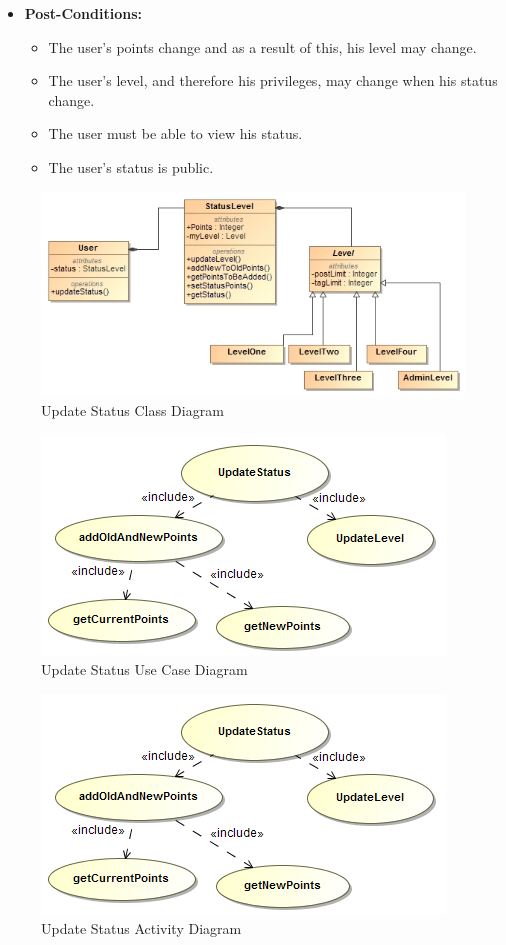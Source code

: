 \documentclass[11pt]{article}
\begin{document}
\begin{enumerate}
\begin{itemize}
\item\textbf{Post-Conditions: }
	\begin{itemize}
		\item The user's points change and as a result of this, his level may change.
		\item The user's level, and therefore his privileges, may change when his status change.
		\item The user must be able to view his status.
		\item The user's status is public.
	\end{itemize}
\end{itemize}
\graphicspath{ {../Diagrams/Maret/class/} }
	\begin{figure}[H]	
    	\includegraphics[scale=0.5]{UpdateStatus.jpg}
    	\caption{Update Status Class Diagram}
	\end{figure}
\graphicspath{ {../Diagrams/Maret/usecase/} }	
	\begin{figure}[H]	
    	\includegraphics[scale=0.5]{UpdateStatus.png}
    	\caption{Update Status Use Case Diagram}
	\end{figure}
	
\graphicspath{ {../Diagrams/Maret/activity/} }
	\begin{figure}[H]	
    	\includegraphics[scale=0.5]{UpdateStatus.png}
    	\caption{Update Status Activity Diagram}
	\end{figure}
	

\end{enumerate}
\end{document}

